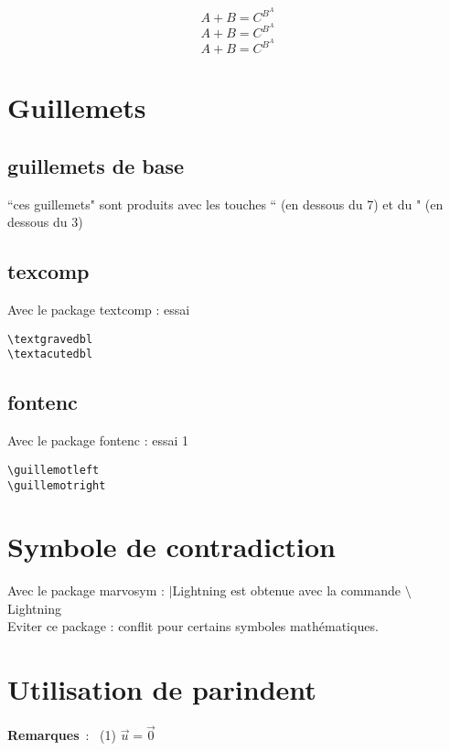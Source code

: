 \documentclass[12pt,french,oneside]{report}
\begin{document}
\begin{spacing}{1.2}
{ $$A+B=C^{B^A}$$}
{ $$A+B=C^{B^A}$$}
{ $$A+B=C^{B^A}$$}

\section{Guillemets}

\subsection{guillemets de base}

``ces guillemets" sont produits avec les touches `` (en dessous du 7) et du " (en dessous du 3)

\subsection{texcomp}

Avec le package textcomp : \textgravedbl essai \textacutedbl 

\begin{verbatim}
\textgravedbl
\textacutedbl
\end{verbatim}

\subsection{fontenc}

Avec le package fontenc : \guillemotleft essai 1 \guillemotright

\begin{verbatim}
\guillemotleft
\guillemotright
\end{verbatim}

\section{Symbole de contradiction}

Avec le package marvosym : $\vert$Lightning est obtenue avec la commande $\setminus$ Lightning\\
Eviter ce package : conflit pour certains symboles mathématiques.

\section{Utilisation de parindent}

\settowidth{\parindent}
{\textbf{Remarques}~:\ }
(1) $\overrightarrow{u}=\overrightarrow{0}$ 


\end{spacing}
\end{document}
